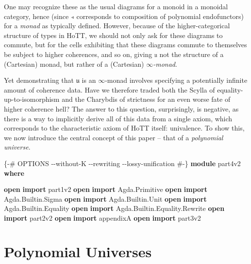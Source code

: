 \documentclass[
  11pt,
  oneside,
  article]{memoir}
\newenvironment{Shaded}{}{}
\newcommand{\KeywordTok}[1]{\textcolor[rgb]{0.00,0.44,0.13}{\textbf{#1}}}
\newcommand{\NormalTok}[1]{#1}
\newcommand{\OtherTok}[1]{\textcolor[rgb]{0.00,0.44,0.13}{#1}}
\newcommand{\PreprocessorTok}[1]{\textcolor[rgb]{0.74,0.48,0.00}{#1}}
\theoremstyle{definition}
\theoremstyle{plain}
\newcommand{\0}{\textsf{0}}
\newcommand{\1}{\tn{\textsf{1}}}
\begin{document}
One may recognize these as the usual diagrams for a monoid in a monoidal
category, hence (since \texttt{◃} corresponds to composition of
polynomial endofunctors) for a \emph{monad} as typically defined.
However, because of the higher-categorical structure of types in HoTT,
we should not only ask for these diagrams to commute, but for the cells
exhibiting that these diagrams commute to themselves be subject to
higher coherences, and so on, giving \texttt{𝔲} not the structure of a
(Cartesian) monad, but rather of a (Cartesian) \emph{\(\infty\)-monad}.

Yet demonstrating that \(𝔲\) is an \(\infty\)-monad involves specifying
a potentially infinite amount of coherence data. Have we therefore
traded both the Scylla of equality-up-to-isomorphism and the Charybdis
of strictness for an even worse fate of higher coherence hell? The
answer to this question, surprisingly, is negative, as there is a way to
implicitly derive all of this data from a single axiom, which
corresponds to the characteristic axiom of HoTT itself: univalence. To
show this, we now introduce the central concept of this paper -- that of
a \emph{polynomial universe}.

\begin{Shaded}
\begin{Highlighting}[]
\PreprocessorTok{\{{-}\# OPTIONS {-}{-}without{-}K {-}{-}rewriting {-}{-}lossy{-}unification \#{-}\}}
\KeywordTok{module}\NormalTok{ part4v2 }\KeywordTok{where}

\KeywordTok{open} \KeywordTok{import}\NormalTok{ part1v2}
\KeywordTok{open} \KeywordTok{import}\NormalTok{ Agda}\OtherTok{.}\NormalTok{Primitive}
\KeywordTok{open} \KeywordTok{import}\NormalTok{ Agda}\OtherTok{.}\NormalTok{Builtin}\OtherTok{.}\NormalTok{Sigma}
\KeywordTok{open} \KeywordTok{import}\NormalTok{ Agda}\OtherTok{.}\NormalTok{Builtin}\OtherTok{.}\NormalTok{Unit}
\KeywordTok{open} \KeywordTok{import}\NormalTok{ Agda}\OtherTok{.}\NormalTok{Builtin}\OtherTok{.}\NormalTok{Equality}
\KeywordTok{open} \KeywordTok{import}\NormalTok{ Agda}\OtherTok{.}\NormalTok{Builtin}\OtherTok{.}\NormalTok{Equality}\OtherTok{.}\NormalTok{Rewrite}
\KeywordTok{open} \KeywordTok{import}\NormalTok{ part2v2}
\KeywordTok{open} \KeywordTok{import}\NormalTok{ appendixA}
\KeywordTok{open} \KeywordTok{import}\NormalTok{ part3v2}
\end{Highlighting}
\end{Shaded}

\chapter{Polynomial Universes}\label{polynomial-universes}
\end{document}
